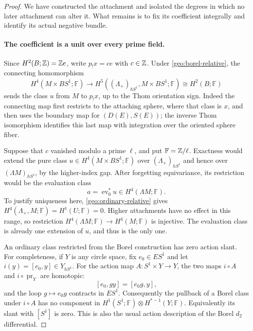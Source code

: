 \begin{proof}
We have constructed the attachment and isolated the degrees in
which no later attachment can alter it. What remains is to fix
its coefficient integrally and identify its actual negative bundle.

\paragraph{The coefficient is a unit over every prime field.}
Since $H^2(B;\mathbb Z)=\mathbb Z e$, write $p_!x=c e$ with $c\in\mathbb Z$.
Under \eqref{geo:borel-relative}, the connecting homomorphism
\[
 H^4(M\times BS^1;\mathbb F)
 \longrightarrow
 H^5((\Lambda_+)_{hS^1},M\times BS^1;\mathbb F)
 \cong H^2(B;\mathbb F)
\]
sends the class $u$ from $M$ to $p_!x$, up to the Thom
orientation sign.  Indeed the connecting map first restricts
to the attaching sphere, where that class is $x$, and then
uses the boundary map for $(D(E),S(E))$; the inverse Thom
isomorphism identifies this last map with integration over the
oriented sphere fiber.

Suppose that $c$ vanished modulo a prime $\ell$, and put
$\mathbb F=\mathbb Z/\ell$.  Exactness would extend the pure class
$u\in H^4(M\times BS^1;\mathbb F)$ over
$(\Lambda_+)_{hS^1}$ and hence over $(\Lambda M)_{hS^1}$,
by the higher-index gap.  After forgetting equivariance, its
restriction would be the evaluation class
\[
 a=\operatorname{ev}_0^*u\in H^4(\Lambda M;\mathbb F).
\]
To justify uniqueness here, \eqref{geo:ordinary-relative} gives
$H^4(\Lambda_+,M;\mathbb F)=H^1(U;\mathbb F)=0$.
Higher attachments have no effect in this range, so restriction
$H^4(\Lambda M;\mathbb F)\to H^4(M;\mathbb F)$ is injective.
The evaluation class is already one extension of $u$, and thus
is the only one.

An ordinary class restricted from the Borel construction has
zero action slant.  For completeness, if $Y$ is any circle space,
fix $e_0\in ES^1$ and let $i(y)=[e_0,y]\in Y_{hS^1}$.
For the action map $A:S^1\times Y\to Y$, the two maps
$i\circ A$ and $i\circ\operatorname{pr}_Y$ are homotopic:
\[
 [e_0,gy]=[e_0g,y],
\]
and the loop $g\mapsto e_0g$ contracts in $ES^1$.
Consequently the pullback of a Borel class under $i\circ A$
has no component in
$H^1(S^1;\mathbb F)\otimes H^{*-1}(Y;\mathbb F)$.
Equivalently its slant with $[S^1]$ is zero.  This is also the
usual action description of the Borel $d_2$ differential.


\end{proof}
